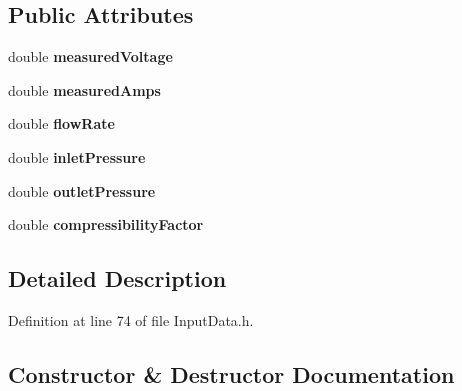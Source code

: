 \subsection*{Public Attributes}
\begin{DoxyCompactItemize}
\item 
\mbox{\label{struct_fan_1_1_field_data_modified_and_optimal_ab83f8ec0206301d0a9183e8f5c21715b}} 
double {\bfseries measured\+Voltage}
\item 
\mbox{\label{struct_fan_1_1_field_data_modified_and_optimal_aeb8d08500d1d4d46249d47fb17b92399}} 
double {\bfseries measured\+Amps}
\item 
\mbox{\label{struct_fan_1_1_field_data_modified_and_optimal_a318f3966d9342fdafa54540cdea17d7e}} 
double {\bfseries flow\+Rate}
\item 
\mbox{\label{struct_fan_1_1_field_data_modified_and_optimal_a8c3c778cad0dd2e28641bb88c3c02d32}} 
double {\bfseries inlet\+Pressure}
\item 
\mbox{\label{struct_fan_1_1_field_data_modified_and_optimal_ad7646d5d42af6d31a8e79956152ee346}} 
double {\bfseries outlet\+Pressure}
\item 
\mbox{\label{struct_fan_1_1_field_data_modified_and_optimal_a3d6486a987abce16f87f9a9895636a9b}} 
double {\bfseries compressibility\+Factor}
\end{DoxyCompactItemize}


\subsection{Detailed Description}


Definition at line 74 of file Input\+Data.\+h.



\subsection{Constructor \& Destructor Documentation}
\mbox{\label{struct_fan_1_1_field_data_modified_and_optimal_a36b1ce30716ee49fab15b711225f1794}} 
